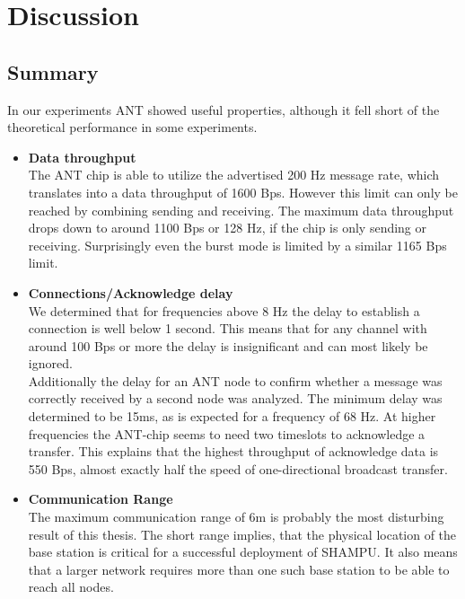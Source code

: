 \chapter{Discussion}
\section{Summary}


In our experiments ANT showed useful properties, although it fell short of the theoretical performance in some experiments.

\begin{itemize}
	\item{\textbf{Data throughput}} \hfill \\ 
	The ANT chip is able to utilize the advertised 200 Hz message rate, which translates into a data throughput of 1600 Bps. However this limit can only be reached by combining sending and receiving. The maximum data throughput drops down to around 1100 Bps or 128 Hz, if the chip is only sending or receiving. Surprisingly even the burst mode is limited by a similar 1165 Bps limit.
	
	\item{\textbf{Connections/Acknowledge delay}} \hfill \\ 
	We determined that for frequencies above 8 Hz the delay to establish a connection is well below 1 second. This means that for any channel with around 100 Bps or more the delay is insignificant and can most likely be ignored. \\
	Additionally the delay for an ANT node to confirm whether a message was correctly received by a second node was analyzed. The minimum delay was determined to be 15ms, as is expected for a frequency of 68 Hz. At higher frequencies the ANT-chip seems to need two timeslots to acknowledge a transfer. This explains that the highest throughput of acknowledge data is 550 Bps, almost exactly half the speed of one-directional broadcast transfer.
	
	\item{\textbf{Communication Range}} \hfill \\ The maximum communication range of 6m is probably the most disturbing result of this thesis. The short range implies, that the physical location of the base station is critical for a successful deployment of SHAMPU. It also means that a larger network requires more than one such base station to be able to reach all nodes. 
\end{itemize}

